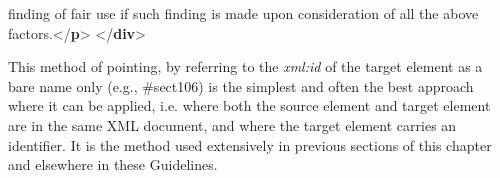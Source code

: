 \begin{shaded}
\hspace*{1em}\hspace*{1em} finding of fair use if such finding is made upon consideration\mbox{}\newline 
\hspace*{1em}\hspace*{1em} of all the above factors.{</\textbf{p}>}\mbox{}\newline 
{</\textbf{div}>}\end{shaded}\egroup\par \noindent  This method of pointing, by referring to the {\itshape xml:id} of the target element as a bare name only (e.g., \#sect106) is the simplest and often the best approach where it can be applied, i.e. where both the source element and target element are in the same XML document, and where the target element carries an identifier. It is the method used extensively in previous sections of this chapter and elsewhere in these Guidelines.
